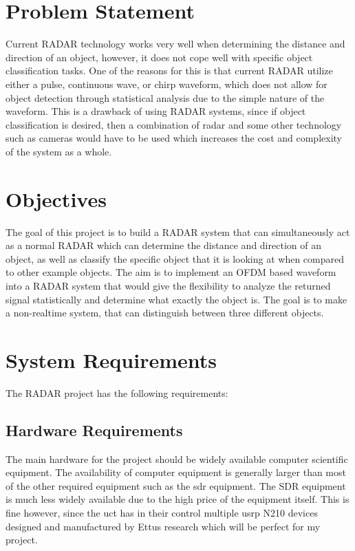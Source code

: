 \documentclass[class=report,11pt,crop=false]{standalone}
\begin{document}
\section{Problem Statement}
Current RADAR technology works very well when determining the distance and direction of an object, however, it does not cope well with specific object classification tasks. One of the reasons for this is that current RADAR utilize either a pulse, continuous wave, or chirp waveform, which does not allow for object detection through statistical analysis due to the simple nature of the waveform. This is a drawback of using RADAR systems, since if object  classification is desired, then a combination of radar and some other technology such as cameras would have to be used which increases the cost and complexity of the system as a whole.

\section{Objectives}
The goal of this project is to build a RADAR system that can simultaneously act as a normal RADAR which can determine the distance and direction of an object, as well as classify the specific object that it is looking at when compared to other example objects. The aim is to implement an OFDM based waveform into a RADAR system that would give the flexibility to analyze the returned signal statistically and determine what exactly the object is. The goal is to make a non-realtime system, that can distinguish between three different objects.


\section{System Requirements}
The RADAR project has the following requirements:

\subsection{Hardware Requirements}
The main hardware for the project should be widely available computer scientific equipment. The availability of computer equipment is generally larger than most of the other required equipment such as the \gls{sdr} equipment. The SDR equipment is much less widely available due to the high price of the equipment itself. This is fine however, since the \gls{uct} has in their control multiple \gls{usrp} N210 devices designed and manufactured by Ettus research which will be perfect for my project.
\end{document}
